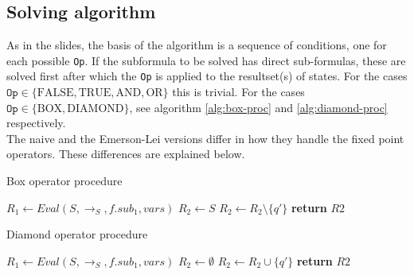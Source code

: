 \documentclass[10pt,a4paper]{article}
\begin{document}
\subsection{Solving algorithm}
As in the slides, the basis of the algorithm is a sequence of conditions, one for each possible \texttt{Op}. If the subformula to be solved has direct sub-formulas, these are solved first after which the \texttt{Op} is applied to the resultset(s) of states. For the cases $\texttt{Op} \in \{\text{FALSE}, \text{TRUE}, \text{AND}, \text{OR}\}$ this is trivial. For the cases $\texttt{Op} \in \{\text{BOX}, \text{DIAMOND}\}$, see algorithm \ref{alg:box-proc} and \ref{alg:diamond-proc} respectively.\\
The naive and the Emerson-Lei versions differ in how they handle the fixed point operators. These differences are explained below.

\begin{algorithm}[H]
\caption{Box operator procedure}\label{alg:box-proc}
\begin{algorithmic}[1]
        	\State $R_1 \gets Eval(S,\to_S,f.sub_1,vars)$ 
        	\State $R_2 \gets S$ 
                	\State $R_2 \gets R_2 \setminus \{q \prime\}$
                \EndIf
    		\EndFor
			\State \textbf{return} $ R2$ 
	\EndProcedure
\end{algorithmic}
\end{algorithm}

\begin{algorithm}[H]
\caption{Diamond operator procedure}\label{alg:diamond-proc}
\begin{algorithmic}[1]
        	\State $R_1 \gets Eval(S,\to_S,f.sub_1,vars)$ 
        	\State $R_2 \gets \emptyset$ 
                	\State $R_2 \gets R_2 \cup \{q \prime\}$
                \EndIf
    		\EndFor
			\State \textbf{return} $ R2$ 
	\EndProcedure
\end{algorithmic}
\end{algorithm}

\end{document}
